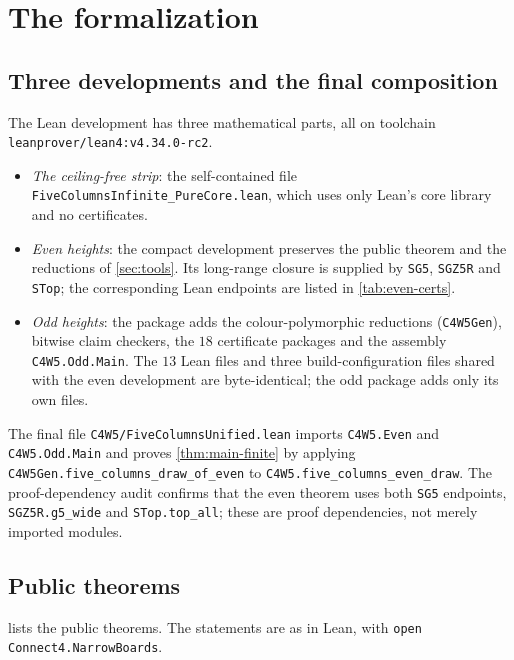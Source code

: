 \documentclass[11pt,a4paper]{article}
\theoremstyle{plain}
\theoremstyle{definition}
\newcommand{\code}[1]{{\upshape\texttt{\small\nolinkurl{#1}}}}
\begin{document}
\section{The formalization}
\label{sec:formal}

\subsection{Three developments and the final composition}
\label{sec:dev}

The Lean development has three mathematical parts, all on toolchain \code{leanprover/lean4:v4.34.0-rc2}.
\begin{itemize}
  \item \emph{The ceiling-free strip}: the self-contained file \code{FiveColumnsInfinite_PureCore.lean}, which uses only Lean's core library and no certificates.
  \item \emph{Even heights}: the compact development preserves the public theorem and the reductions of \cref{sec:tools}. Its long-range closure is supplied by \code{SG5}, \code{SGZ5R} and \code{STop}; the corresponding Lean endpoints are listed in \cref{tab:even-certs}.
  \item \emph{Odd heights}: the package adds the colour-polymorphic reductions (\code{C4W5Gen}), bitwise claim checkers, the $18$ certificate packages and the assembly \code{C4W5.Odd.Main}. The $13$ Lean files and three build-configuration files shared with the even development are byte-identical; the odd package adds only its own files.
\end{itemize}
The final file \code{C4W5/FiveColumnsUnified.lean} imports \code{C4W5.Even} and \code{C4W5.Odd.Main} and proves \cref{thm:main-finite} by applying \code{C4W5Gen.five_columns_draw_of_even} to \code{C4W5.five_columns_even_draw}. The proof-dependency audit confirms that the even theorem uses both \code{SG5} endpoints, \code{SGZ5R.g5_wide} and \code{STop.top_all}; these are proof dependencies, not merely imported modules.

\subsection{Public theorems}
\label{sec:public}

 lists the public theorems. The statements are as in Lean, with \code{open Connect4.NarrowBoards}.
\end{document}
